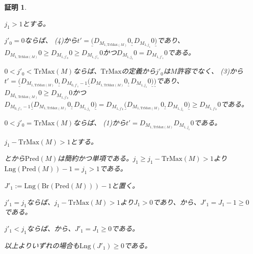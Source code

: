 \documentclass[dvipdfmx,uplatex]{jsarticle}
\theoremstyle{customnonumberbreakfortheorem}
\theoremstyle{customnonumberbreakforproof}
\newtheorem{hideableproof}{証明}
\begin{document}
\begin{hideableproof}
\begin{indented}
\begin{indented}
\begin{indented}
			\end{indented}
			\item \(j_1 > 1\)とする。
			\begin{indented}
				\item \(j'_0 = 0\)ならば、 (4)から\(t' = \underline{(} D_{M_{1,\textrm{TrMax}(M)}} 0 \underline{,} D_{M_{1,j_1}} 0 \underline{)}\)であり、\(D_{M_{1,\textrm{TrMax}(M)}} 0 \geq D_{M_{1,j'_0}} 0 \geq D_{M_{1,j'_1}} 0\)かつ\(D_{M_{1,j_1}} 0 = D_{M_{1,j'_1}} 0\)である。
				\item \(0 < j'_0 < \textrm{TrMax}(M)\)ならば、\(\textrm{TrMax}\)の定義から\(j'_0\)は\(M\)許容でなく、 (3)から\(t' = \underline{(} D_{M_{1,\textrm{TrMax}(M)}} 0 \underline{,} D_{M_{0,j'_1}-1} \underline{(} D_{M_{1,\textrm{TrMax}(M)}} 0 \underline{,} D_{M_{1,j_1}} 0 \underline{)} \underline{)}\)であり、\(D_{M_{1,\textrm{TrMax}(M)}} 0 \geq D_{M_{1,j'_0}} 0\)かつ\(D_{M_{0,j'_1}-1} \underline{(} D_{M_{1,\textrm{TrMax}(M)}} 0 \underline{,} D_{M_{1,j_1}} 0 \underline{)} = D_{M_{1,j'_0}} \underline{(} D_{M_{1,\textrm{TrMax}(M)}} 0 \underline{,} D_{M_{1,j_1}} 0 \underline{)} \geq D_{M_{1,j'_0}} 0\)である。
				\item \(0 < j'_0 = \textrm{TrMax}(M)\)ならば、 (1)から\(t' = D_{M_{1,\textrm{TrMax}(M)}} D_{M_{1,j_1}} 0\)である。
			\end{indented}
		\end{indented}
		\item \(j_1 - \textrm{TrMax}(M) > 1\)とする。
		\begin{indented}
			\item {}とから\(\textrm{Pred}(M)\)は簡約かつ単項である。\(j_1 \geq j_1 - \textrm{TrMax}(M) > 1\)より\(\textrm{Lng}(\textrm{Pred}(M))-1 = j_1 > 1\)である。
			\item \(J'_1 := \textrm{Lng}(\textrm{Br}(\textrm{Pred}(M)))-1\)と置く。
			\item \(j'_1 = j_1\)ならば、\(j_1 - \textrm{TrMax}(M) > 1\)より\(J_1 > 0\)であり、から、\(J'_1 = J_1-1 \geq 0\)である。
			\item \(j'_1 < j_1\)ならば、から、\(J'_1 = J_1 \geq 0\)である。
			\item 以上よりいずれの場合も\(\textrm{Lng}(J'_1) \geq 0\)である。

\end{indented}
\end{indented}
\end{hideableproof}
\end{document}

